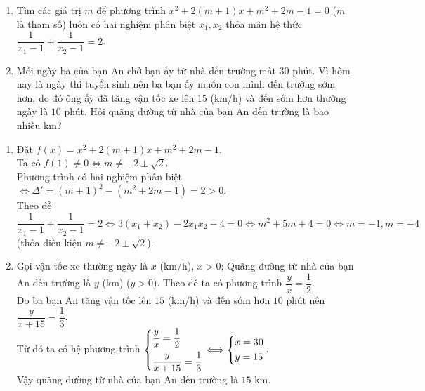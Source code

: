 \begin{ex}%
    \hfill
    \begin{enumerate}
        \item Tìm các giá trị $m$ để phương trình $x^2+2(m+1)x+m^2+2m-1=0$ ($m$ là tham số) luôn có hai nghiệm phân biệt $x_1, x_2$ thỏa mãn hệ thức $\dfrac{1}{x_1-1}+\dfrac{1}{x_2-1}=2$.
        \item Mỗi ngày ba của bạn An chở bạn ấy từ nhà đến trường mất $30$ phút. Vì hôm nay là ngày thi tuyển sinh nên ba bạn ấy muốn con mình đến trường sớm hơn, do đó ông ấy đã tăng vận tốc xe lên $15$ (km/h) và đến sớm hơn thường ngày là $10$ phút. Hỏi quãng đường từ nhà của bạn An đến trường là bao nhiêu km?
    \end{enumerate}
\loigiai
    {
    \begin{enumerate}
        \item Đặt $f(x)=x^2+2(m+1)x+m^2+2m-1$.\\Ta có $f(1)\neq 0\Longleftrightarrow m\neq -2\pm\sqrt 2$.\\Phương trình có hai nghiệm phân biệt $\Longleftrightarrow\Delta'=(m+1)^2-(m^2+2m-1)=2>0$.\\Theo đề $\dfrac{1}{x_1-1}+\dfrac{1}{x_2-1}=2\Longleftrightarrow 3\left(x_1+x_2\right)-2x_1x_2-4=0\Longleftrightarrow m^2+5m+4=0\Longleftrightarrow m=-1, m=-4$ (thỏa điều kiện $m\neq -2\pm\sqrt 2$).

        \item Gọi vận tốc xe thường ngày là $x$ (km/h), $x>0$; Quãng đường từ nhà của bạn An đến trường là $y$ (km) ($y>0$). Theo đề ta có phương trình $\dfrac{y}{x}=\dfrac{1}{2}$.\\Do ba bạn An tăng vận tốc lên $15$ (km/h) và đến sớm hơn $10$ phút nên $\dfrac{y}{x+15}=\dfrac{1}{3}$.\\Từ đó ta có hệ phương trình $\left\{\begin{aligned}&\dfrac{y}{x}=\dfrac{1}{2}\\&\dfrac{y}{x+15}=\dfrac{1}{3}\end{aligned}\right.\Longleftrightarrow\left\{\begin{aligned}&x=30\\&y=15\end{aligned}\right.$.\\Vậy quãng đường từ nhà của bạn An đến trường là $15$ km.
    \end{enumerate}
    }
\end{ex}

